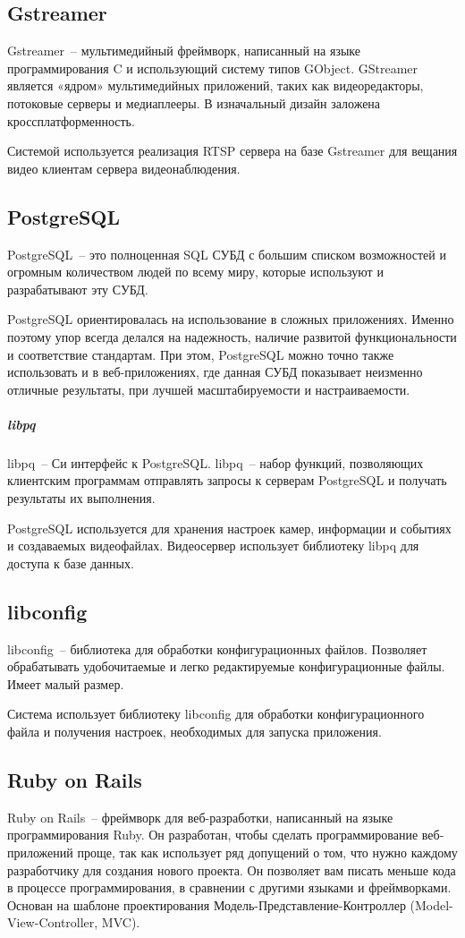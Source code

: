 \subsection{Gstreamer}
Gstreamer~-- мультимедийный фреймворк, написанный на языке программирования C и
использующий систему типов GObject. GStreamer является «ядром» мультимедийных приложений,
таких как видеоредакторы, потоковые серверы и медиаплееры. В изначальный дизайн заложена
кроссплатформенность.

Системой используется реализация RTSP сервера на базе Gstreamer для вещания видео клиентам сервера
видеонаблюдения.

\subsection{PostgreSQL}
PostgreSQL~-- это полноценная SQL СУБД с большим списком возможностей и огромным количеством
людей по всему миру, которые используют и разрабатывают эту СУБД.

PostgreSQL ориентировалась на использование в сложных приложениях. Именно поэтому упор всегда делался
на надежность, наличие развитой функциональности и соответствие стандартам. При этом, PostgreSQL
можно точно также использовать и в веб-приложениях, где данная СУБД показывает неизменно отличные
результаты, при лучшей масштабируемости и настраиваемости.

\subparagraph{libpq}
libpq~-- Си интерфейс к PostgreSQL. libpq~-- набор функций, позволяющих клиентским программам
отправлять запросы к серверам PostgreSQL и получать результаты их выполнения.

PostgreSQL используется для хранения настроек камер, информации и событиях и создаваемых видеофайлах.
Видеосервер использует библиотеку libpq для доступа к базе данных.

\subsection{libconfig}
libconfig~-- библиотека для обработки конфигурационных файлов.
Позволяет обрабатывать удобочитаемые и легко редактируемые конфигурационные файлы.
Имеет малый размер.

Система использует библиотеку libconfig для обработки конфигурационного файла и получения настроек,
необходимых для запуска приложения.

\subsection{Ruby on Rails}
Ruby on Rails~-- фреймворк для веб-разработки, написанный на языке программирования Ruby.
Он разработан, чтобы сделать программирование веб-приложений проще, так как использует ряд допущений
о том, что нужно каждому разработчику для создания нового проекта. Он позволяет вам писать меньше
кода в процессе программирования, в сравнении с другими языками и фреймворками. Основан на
шаблоне проектирования Модель-Представление-Контроллер (Model-View-Controller, MVC).

